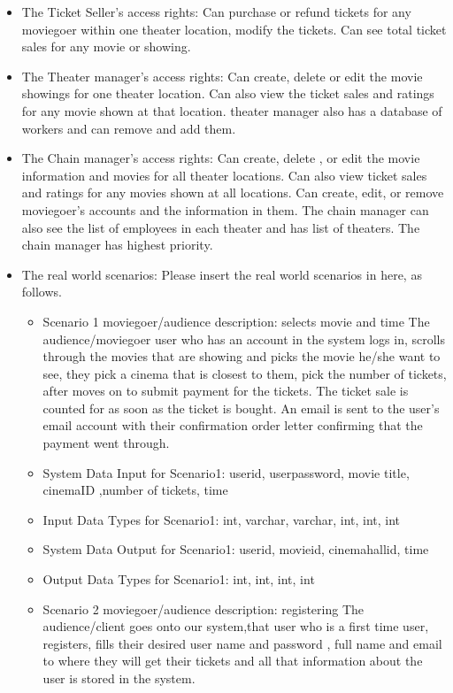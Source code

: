 {\begin{itemize}
\begin{itemize}
\item{The Ticket Seller's access rights: }
Can purchase or refund tickets for any moviegoer within one theater location, modify the tickets. Can see total ticket sales for any movie or showing.
\item{The Theater manager's access rights: }
Can create, delete or edit the movie showings for one theater location. Can also view the ticket sales and ratings for any movie shown at that location. theater manager also has a database of workers and can remove and add them.
\item{The Chain manager's access rights: }
Can create, delete , or edit the movie information and movies for all theater locations.  Can also view ticket sales and ratings for any movies shown at all locations. Can create, edit, or remove moviegoer's accounts and the information in them. The chain manager can also see the list of employees in each theater and has list of theaters. The chain manager has highest priority.
\item{The real world scenarios: }
Please insert the real world scenarios in here, as follows.
	\begin{itemize} 
	\item{Scenario 1 moviegoer/audience description: selects movie and time}
	The audience/moviegoer user who has an account in the system logs in, scrolls through the movies that are showing and picks the movie he/she want to see, they pick a cinema that is closest to them, pick the number of tickets, after moves on to submit payment for the tickets. The ticket sale is counted for as soon as the ticket is bought. An email is sent to the user's email account with their confirmation order letter confirming that the payment went through.
	\item{System Data Input for Scenario1: }
	userid, userpassword, movie title, cinemaID ,number of tickets, time
	\item{Input Data Types for Scenario1: }
	int, varchar, varchar, int, int, int
	\item{System Data Output for Scenario1: }
	userid, movieid, cinemahallid, time
	\item{Output Data Types for Scenario1: }
	int, int, int, int
	\end{itemize}
	\begin{itemize} 
	\item{Scenario 2 moviegoer/audience description: registering}
	The audience/client goes onto our system,that user who is a first time user, registers, fills their desired user name and password , full name and email to where they will get their tickets and all that information about the user is stored in the system.

\end{itemize}
\end{itemize}
\end{itemize}}
